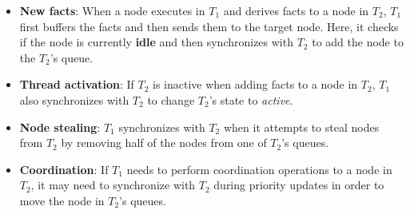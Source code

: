 \begin{itemize}
   \item \textbf{New facts}: When a node executes in $T_1$ and derives facts
   to a node in $T_2$, $T_1$ first buffers the facts 
   and then sends them to the target node. Here, it checks if the
   node is currently \textbf{idle} and then synchronizes with $T_2$ to add the
   node to the $T_2$'s queue.
   \item \textbf{Thread activation}: If $T_2$ is inactive when adding facts to a node in
   $T_2$, $T_1$ also synchronizes with $T_2$ to change $T_2$'s state to \emph{active}.
   \item \textbf{Node stealing}: $T_1$ synchronizes with $T_2$ when it attempts to steal
   nodes from $T_2$ by removing half of the nodes from one of $T_2$'s queues.
   \item \textbf{Coordination}: If $T_1$ needs to perform coordination operations
   to a node in $T_2$, it may need to synchronize with $T_2$ during priority
   updates in order to move the node in $T_2$'s queues.
\end{itemize}


